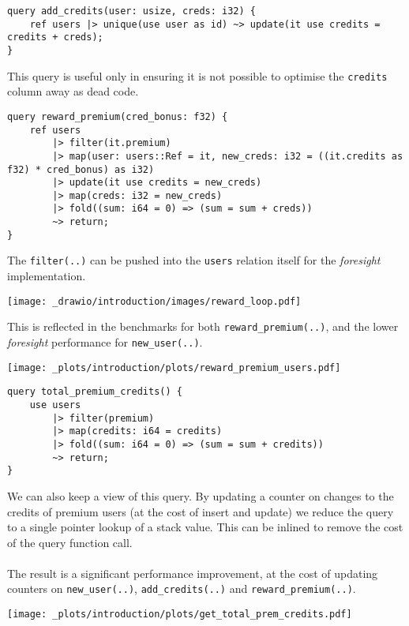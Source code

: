 \begin{verbatim}
query add_credits(user: usize, creds: i32) {
    ref users |> unique(use user as id) ~> update(it use credits = credits + creds);
}
\end{verbatim}
This query is useful only in ensuring it is not possible to optimise the \texttt{credits} column away as dead code.
\begin{verbatim}
query reward_premium(cred_bonus: f32) {
    ref users
        |> filter(it.premium)
        |> map(user: users::Ref = it, new_creds: i32 = ((it.credits as f32) * cred_bonus) as i32)
        |> update(it use credits = new_creds)
        |> map(creds: i32 = new_creds)
        |> fold((sum: i64 = 0) => (sum = sum + creds))
        ~> return;
}
\end{verbatim}
The \texttt{filter(..)} can be pushed into the \texttt{users} relation itself for the \textit{foresight} implementation.
\begin{center}
    \texttt{[image: \_drawio/introduction/images/reward\_loop.pdf]}
\end{center}
This is reflected in the benchmarks for both \texttt{reward_premium(..)}, and the lower \textit{foresight} performance for \texttt{new_user(..)}.
\begin{center}
    \texttt{[image: \_plots/introduction/plots/reward\_premium\_users.pdf]}
\end{center}
\begin{verbatim}
query total_premium_credits() {
    use users
        |> filter(premium)
        |> map(credits: i64 = credits)
        |> fold((sum: i64 = 0) => (sum = sum + credits))
        ~> return;
}    
\end{verbatim}
We can also keep a view of this query. By updating a counter on changes to the
credits of premium users (at the cost of insert and update) we reduce the query
to a single pointer lookup of a stack value. This can be inlined to remove the
cost of the query function call.
\\
\\ The result is a significant performance improvement, at the cost of updating counters on \texttt{new_user(..)}, \texttt{add_credits(..)} and \texttt{reward_premium(..)}.
\begin{center}
    \texttt{[image: \_plots/introduction/plots/get\_total\_prem\_credits.pdf]}
\end{center}

